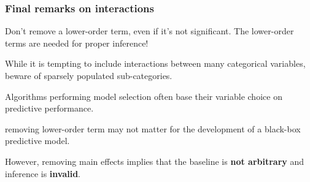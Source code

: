 \documentclass{beamer}
\begin{document}
\begin{frame}[fragile]
\frametitle{Final remarks on interactions}
\bi
\item Don't remove a lower-order term, even if it's not significant.  The lower-order terms are needed for proper inference!
\item While it is tempting to include interactions between many categorical variables, beware of sparsely populated sub-categories.
\item Algorithms performing model selection often base their variable choice on  predictive performance.
\bi \item removing lower-order term may not matter for the development of a black-box predictive model.
\ei 
\item However, removing main effects implies that the baseline is \textbf{not arbitrary} and inference is \textbf{invalid}.
\ei
\end{frame}
\end{document}
